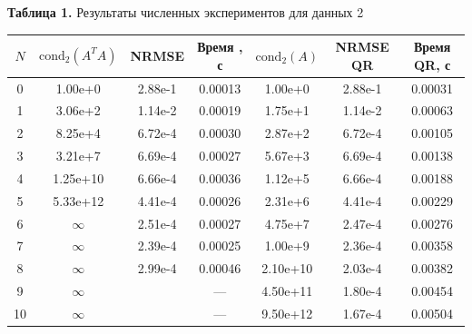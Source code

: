 \documentclass[a4paper,12pt]{article}
\begin{document}
	\vspace{1.5em}
	\noindent \textbf{Таблица 1.} Результаты численных экспериментов для данных  2
	\begin{table}[H]
		\centering
		\small
		\begin{tabular}{|c|c|c|c|c|c|c|}
			\hline
			$N$ & $\text{cond}_2(A^T A)$ & NRMSE  & Время , с & $\text{cond}_2(A)$ & NRMSE QR & Время QR, с \\ \hline
			0  & 1.00e+0  & 2.88e-1 & 0.00013 & 1.00e+0 & 2.88e-1 & 0.00031 \\ \hline
			1  & 3.06e+2  & 1.14e-2 & 0.00019 & 1.75e+1 & 1.14e-2 & 0.00063 \\ \hline
			2  & 8.25e+4  & 6.72e-4 & 0.00030 & 2.87e+2 & 6.72e-4 & 0.00105 \\ \hline
			3  & 3.21e+7  & 6.69e-4 & 0.00027 & 5.67e+3 & 6.69e-4 & 0.00138 \\ \hline
			4  & 1.25e+10 & 6.66e-4 & 0.00036 & 1.12e+5 & 6.66e-4 & 0.00188 \\ \hline
			5  & 5.33e+12 & 4.41e-4 & 0.00026 & 2.31e+6 & 4.41e-4 & 0.00229 \\ \hline
			6  & $\infty$ & 2.51e-4 & 0.00027 & 4.75e+7 & 2.47e-4 & 0.00276 \\ \hline
			7  & $\infty$ & 2.39e-4 & 0.00025 & 1.00e+9 & 2.36e-4 & 0.00358 \\ \hline
			8  & $\infty$ & 2.99e-4 & 0.00046 & 2.10e+10& 2.03e-4 & 0.00382 \\ \hline
			9  & $\infty$ & & ---     & 4.50e+11& 1.80e-4 & 0.00454 \\ \hline
			10 & $\infty$ & & ---     & 9.50e+12& 1.67e-4 & 0.00504 \\ \hline
		\end{tabular}
	\end{table}
	
\end{document}
